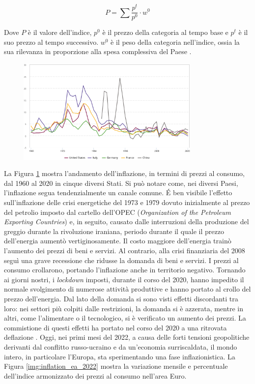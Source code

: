 \begin{equation}
	P = \sum{\frac{p^t}{p^0} \cdot w^{0}}
\end{equation}

Dove $P$ è il valore dell'indice, $p^0$ è il prezzo della categoria al tempo base e $p^t$ è il suo prezzo al tempo successivo. $w^0$ è il peso della categoria nell'indice, ossia la sua  rilevanza in proporzione alla spesa complessiva del Paese \parencite{Eurostat:layeres_formula}.

\begin{figure}[h]
	\centering
	\includegraphics[width=0.80\textwidth]{img/inflation_1990_2020.pdf}
	\caption{}
	\label{img:inflation_1990_2020}
\end{figure}

La Figura \ref{img:inflation_1990_2020} mostra l'andamento dell'inflazione, in termini di prezzi al consumo, dal 1960 al 2020 in cinque diversi Stati. Si può notare come, nei diversi Paesi, l'inflazione segua tendenzialmente un canale comune. \'E ben visibile l'effetto sull'inflazione delle crisi energetiche del 1973 e 1979 dovuto inizialmente al prezzo del petrolio imposto dal cartello dell'OPEC (\textit{Organization of the Petroleum Exporting Countries}) e, in seguito, causato dalle interruzioni della produzione del greggio durante la rivoluzione iraniana, periodo durante il quale il prezzo dell'energia aumentò vertiginosamente. Il costo maggiore dell'energia trainò l'aumento dei prezzi di beni e servizi. Al contrario, alla crisi finanziaria del 2008 seguì una grave recessione che ridusse la domanda di beni e servizi. I prezzi al consumo crollarono, portando l'inflazione anche in territorio negativo. Tornando ai giorni nostri, i \textit{lockdown} imposti, durante il corso del 2020, hanno impedito il normale svolgimento di numerose attività produttive e hanno portato al crollo del prezzo dell'energia. Dal lato della domanda si sono visti effetti discordanti tra loro: nei settori più colpiti dalle restrizioni, la domanda si è azzerata, mentre in altri, come l'alimentare o il tecnologico, si è verificato un aumento dei prezzi. La commistione di questi effetti ha portato nel corso del 2020 a una ritrovata deflazione \parencite{Blanchard_macroeconomia}. Oggi, nei primi mesi del 2022, a causa delle forti tensioni geopolitiche derivanti dal conflitto russo-ucraino e da un'economia surriscaldata, il mondo intero, in particolare l'Europa, sta sperimentando una fase inflazionistica. La Figura \ref{img:inflation_ea_2022} mostra la variazione mensile e percentuale dell'indice armonizzato dei prezzi al consumo nell'area Euro.

